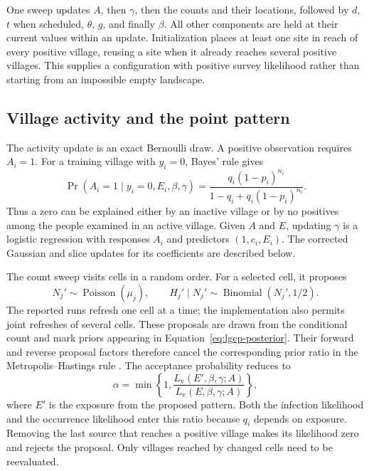 One sweep updates $A$, then $\gamma$, then the counts and their locations, followed by $d$, $t$ when scheduled, $\theta$, $g$, and finally $\beta$. All other components are held at their current values within an update. Initialization places at least one site in reach of every positive village, reusing a site when it already reaches several positive villages. This supplies a configuration with positive survey likelihood rather than starting from an impossible empty landscape.

\subsection{Village activity and the point pattern}

The activity update is an exact Bernoulli draw. A positive observation requires $A_i=1$. For a training village with $y_i=0$, Bayes' rule gives
\[
 \Pr(A_i=1\mid y_i=0,E_i,\beta,\gamma)
 =\frac{q_i(1-p_i)^{n_i}}
 {1-q_i+q_i(1-p_i)^{n_i}}.
\]
Thus a zero can be explained either by an inactive village or by no positives among the people examined in an active village. Given $A$ and $E$, updating $\gamma$ is a logistic regression with responses $A_i$ and predictors $(1,c_i,E_i)$. The corrected Gaussian and slice updates for its coefficients are described below.

The count sweep visits cells in a random order. For a selected cell, it proposes
\[
 N_j'\sim\operatorname{Poisson}(\mu_j),\qquad
 H_j'\mid N_j'\sim\operatorname{Binomial}(N_j',1/2).
\]
The reported runs refresh one cell at a time; the implementation also permits joint refreshes of several cells. These proposals are drawn from the conditional count and mark priors appearing in Equation~\eqref{eq:lgcp-posterior}. Their forward and reverse proposal factors therefore cancel the corresponding prior ratio in the Metropolis--Hastings rule \citep[Section~2.2]{hastings1970}. The acceptance probability reduces to
\begin{equation}\label{eq:count-acceptance}
 \alpha=\min\left\{1,
 \frac{L_{\mathrm v}(E',\beta,\gamma;A)}
      {L_{\mathrm v}(E,\beta,\gamma;A)}\right\},
\end{equation}
where $E'$ is the exposure from the proposed pattern. Both the infection likelihood and the occurrence likelihood enter this ratio because $q_i$ depends on exposure. Removing the last source that reaches a positive village makes its likelihood zero and rejects the proposal. Only villages reached by changed cells need to be reevaluated.

